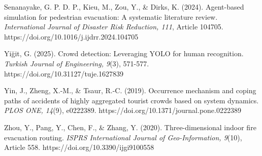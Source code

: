 \documentclass[
]{article}
\begin{document}
Senanayake, G. P. D. P., Kieu, M., Zou, Y., \& Dirks, K. (2024).
Agent-based simulation for pedestrian evacuation: A systematic
literature review. \emph{International Journal of Disaster Risk
Reduction, 111}, Article 104705.
https://doi.org/10.1016/j.ijdrr.2024.104705

Yiğit, G. (2025). Crowd detection: Leveraging YOLO for human
recognition. \emph{Turkish Journal of Engineering, 9}(3), 571-577.
https://doi.org/10.31127/tuje.1627839

Yin, J., Zheng, X.-M., \& Tsaur, R.-C. (2019). Occurrence mechanism and
coping paths of accidents of highly aggregated tourist crowds based on
system dynamics. \emph{PLOS ONE, 14}(9), e0222389.
https://doi.org/10.1371/journal.pone.0222389

Zhou, Y., Pang, Y., Chen, F., \& Zhang, Y. (2020). Three-dimensional
indoor fire evacuation routing. \emph{ISPRS International Journal of
Geo-Information, 9}(10), Article 558.
https://doi.org/10.3390/ijgi9100558
\end{document}
